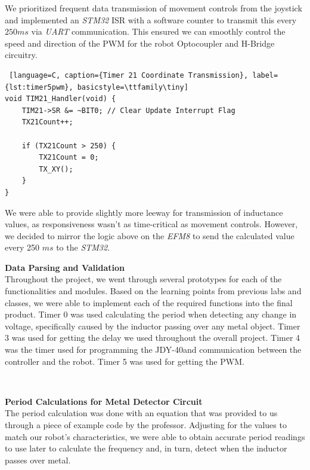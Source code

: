 \documentclass{article}
\begin{document}
We prioritized frequent data transmission of movement controls from the joystick and implemented an \textit{STM32} ISR with a software counter
to transmit this every $250 ms$ via \textit{UART} communication. This ensured we can smoothly control the speed and
direction of the PWM for the robot Optocoupler and H-Bridge circuitry.

\begin{lstlisting} [language=C, caption={Timer 21 Coordinate Transmission}, label={lst:timer5pwm}, basicstyle=\ttfamily\tiny]
void TIM21_Handler(void) {
	TIM21->SR &= ~BIT0; // Clear Update Interrupt Flag
	TX21Count++;

	if (TX21Count > 250) {
		TX21Count = 0;
		TX_XY();
	}
}
\end{lstlisting}

We were able to provide slightly more leeway for transmission of inductance values, as responsiveness wasn't as time-critical as movement controls. However, we
decided to mirror the logic above on the \textit{EFM8} to send the calculated value every 250 $ms$ to the \textit{STM32}.

\textbf{Data Parsing and Validation} \\ %


Throughout the project, we went through several prototypes for each of the functionalities and modules. Based on the learning points from previous labs and classes, we were able to implement each of the required functions into the final product.
Timer 0 was used calculating the period when detecting any change in voltage, specifically caused by the inductor passing over any metal object. Timer 3 was used for getting the delay we used throughout the overall project. Timer 4 was the timer used for programming the JDY-40and communication between the controller and the robot. Timer 5 was used for getting the PWM.

\

\textbf{Period Calculations for Metal Detector Circuit} \\
The period calculation was done with an equation that was provided to us through a piece of example code by the professor. Adjusting for the values to match our robot's characteristics, we were able to obtain accurate period readings to use later to calculate the frequency and, in turn, detect when the inductor passes over metal.

\
\end{document}

